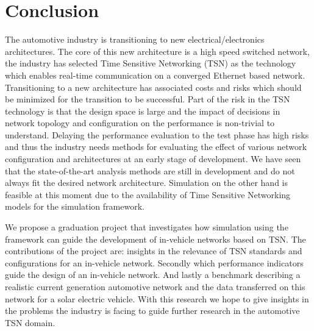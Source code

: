 \section{Conclusion}
\label{sec:conclusion}
The automotive industry is transitioning to new electrical/electronics architectures. The core of this new architecture is a high speed switched network, the industry has selected Time Sensitive Networking (TSN) as the technology which enables real-time communication on a converged Ethernet based network. Transitioning to a new architecture has associated costs and risks which should be minimized for the transition to be successful. Part of the risk in the TSN technology is that the design space is large and the impact of decisions in network topology and configuration on the performance is non-trivial to understand. Delaying the performance evaluation to the test phase has high risks and thus the industry needs methods for evaluating the effect of various network configuration and architectures at an early stage of development. We have seen that the state-of-the-art analysis methods are still in development and do not always fit the desired network architecture. Simulation on the other hand is feasible at this moment due to the availability of Time Sensitive Networking models for the \omnet simulation framework. 

We propose a graduation project that investigates how simulation using the \omnet framework can guide the development of in-vehicle networks based on TSN. The contributions of the project are: insights in the relevance of TSN standards and configurations for an in-vehicle network. Secondly which performance indicators guide the design of an in-vehicle network. And lastly a benchmark describing a realistic current generation automotive network and the data transferred on this network for a solar electric vehicle. With this research we hope to give insights in the problems the industry is facing to guide further research in the automotive TSN domain.